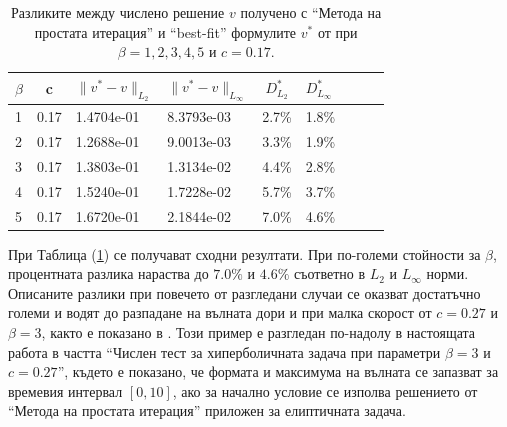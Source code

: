\documentclass{article}
\newcommand{\rf}[1]{(\ref{#1})}
\begin{document}
\begin{table}[ht]
\centering
\begin{tabular}{|l|c|l l| c|l|c|l l|}
\hline 
\hline 
$\beta$	& c 	& $\|v^*-v \|_{L_2 }$ & $\|v^*-v \|_{L_\infty }$  	& $D^*_{L_2}$	& $D^*_{L_\infty }$	\\
\hline 
1& 		0.17&	1.4704e-01 		& 	8.3793e-03 				& 2.7\%			& 1.8\%		\\
\hline 
2& 		0.17&	1.2688e-01 		& 	9.0013e-03				& 3.3\%			& 1.9\%		\\
\hline 
3& 		0.17&	1.3803e-01 		& 	1.3134e-02				& 4.4\%			& 2.8\%		\\
\hline 
4& 		0.17&	 1.5240e-01 		& 	1.7228e-02				& 5.7\%			& 3.7\%		\\
\hline 
5& 		0.17&	1.6720e-01 		& 	2.1844e-02				& 7.0\%			& 4.6\%		\\
\hline 
\hline 
\end{tabular}
\caption{Разликите между числено решение $v$ получено с ``Метода на простата итерация'' и ``best-fit'' формулите $v^*$ от \cite{Ch2011} при $\beta=1, 2, 3, 4, 5$ и $c=0.17$.}
\label{tab:diff-c017}
\end{table}
При Таблица \rf{tab:diff-c017} се получават сходни резултати. При по-големи стойности за $\beta$, процентната разлика нараства до $7.0\%$ и $4.6\%$ съответно в $L_2$ и $L_\infty$ норми. Описаните разлики при повечето от разгледани случаи се оказват достатъчно големи и водят до разпадане на вълната дори и при малка скорост от $c=0.27$ и $\beta = 3$, както е показано в \cite{ref21, dani, milenaDani}. Този пример е разгледан по-надолу в настоящата работа в частта ``Числен тест за хиперболичната задача при параметри $\beta = 3$ и $c=0.27$'', където е показано, че формата и максимума на вълната се запазват за времевия интервал $[0, 10]$, ако за начално условие се изполва решението от ``Метода на простата итерация'' приложен за елиптичната задача. 
\end{document}
